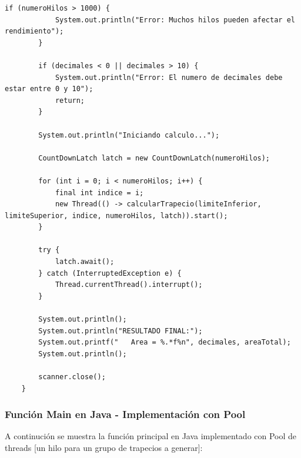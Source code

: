 \begin{lstlisting}[style=java-custom, caption={Función Main en Java}]
        if (numeroHilos > 1000) {
            System.out.println("Error: Muchos hilos pueden afectar el rendimiento");
        }

        if (decimales < 0 || decimales > 10) {
            System.out.println("Error: El numero de decimales debe estar entre 0 y 10");
            return;
        }

        System.out.println("Iniciando calculo...");

        CountDownLatch latch = new CountDownLatch(numeroHilos);

        for (int i = 0; i < numeroHilos; i++) {
            final int indice = i;
            new Thread(() -> calcularTrapecio(limiteInferior, limiteSuperior, indice, numeroHilos, latch)).start();
        }

        try {
            latch.await();
        } catch (InterruptedException e) {
            Thread.currentThread().interrupt();
        }

        System.out.println();
        System.out.println("RESULTADO FINAL:");
        System.out.printf("   Area = %.*f%n", decimales, areaTotal);
        System.out.println();

        scanner.close();
    }
\end{lstlisting}

\subsubsection {Función Main en Java - Implementación con Pool}

A continución se muestra la función principal en Java implementado con Pool de threads [un hilo para un grupo de trapecios a generar]:

